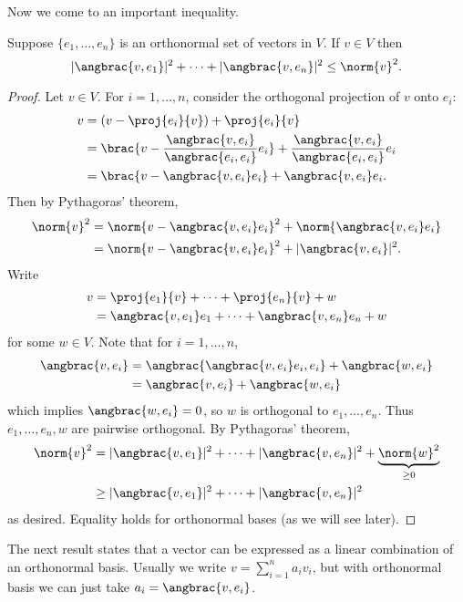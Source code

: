 Now we come to an important inequality.

\begin{lemma}
Suppose $\{e_1,\dots,e_n\}$ is an orthonormal set of vectors in $V$. If $v\in V$ then
\begin{equation}
|\angbrac{v,e_1}|^2+\cdots+|\angbrac{v,e_n}|^2\le\norm{v}^2.
\end{equation}
\end{lemma}

\begin{proof}
Let $v\in V$. For $i=1,\dots,n$, consider the orthogonal projection of $v$ onto $e_i$:
\begin{align*}
v&=(v-\proj{e_i}{v})+\proj{e_i}{v}\\
&=\brac{v-\frac{\angbrac{v,e_i}}{\angbrac{e_i,e_i}}e_i}+\frac{\angbrac{v,e_i}}{\angbrac{e_i,e_i}}e_i\\
&=\brac{v-\angbrac{v,e_i}e_i}+\angbrac{v,e_i}e_i.
\end{align*}
Then by Pythagoras' theorem,
\begin{align*}
\norm{v}^2
&=\norm{v-\angbrac{v,e_i}e_i}^2+\norm{\angbrac{v,e_i}e_i}\\
&=\norm{v-\angbrac{v,e_i}e_i}^2+|\angbrac{v,e_i}|^2.
\end{align*}
Write
\begin{align*}
v&=\proj{e_1}{v}+\cdots+\proj{e_n}{v}+w\\
&=\angbrac{v,e_1}e_1+\cdots+\angbrac{v,e_n}e_n+w
\end{align*}
for some $w\in V$. Note that for $i=1,\dots,n$,
\begin{align*}
\angbrac{v,e_i}
&=\angbrac{\angbrac{v,e_i}e_i,e_i}+\angbrac{w,e_i}\\
&=\angbrac{v,e_i}+\angbrac{w,e_i}
\end{align*}
which implies $\angbrac{w,e_i}=0$, so $w$ is orthogonal to $e_1,\dots,e_n$. Thus $e_1,\dots,e_n,w$ are pairwise orthogonal. By Pythagoras' theorem,
\begin{align*}
\norm{v}^2
&=|\angbrac{v,e_1}|^2+\cdots+|\angbrac{v,e_n}|^2+\underbrace{\norm{w}^2}_{\ge0}\\
&\ge|\angbrac{v,e_1}|^2+\cdots+|\angbrac{v,e_n}|^2
\end{align*}
as desired. Equality holds for orthonormal bases (as we will see later).
\end{proof}

The next result states that a vector can be expressed as a linear combination of an orthonormal basis. Usually we write $v=\sum_{i=1}^{n}a_iv_i$, but with orthonormal basis we can just take $a_i=\angbrac{v,e_i}$.

